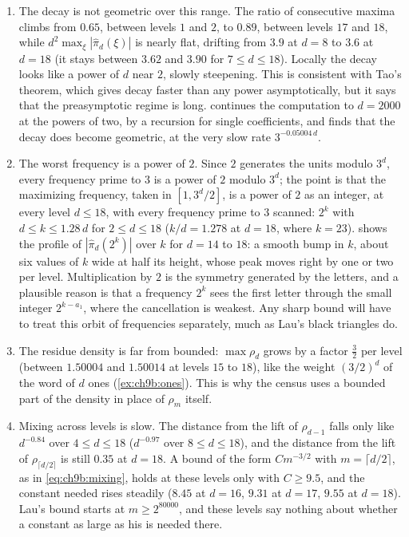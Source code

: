 \begin{enumerate}
\item The decay is not geometric over this range. The ratio of consecutive maxima climbs from $0.65$, between levels $1$ and $2$, to $0.89$, between levels $17$ and $18$, while $d^2\max_\xi|\widehat\pi_d(\xi)|$ is nearly flat, drifting from $3.9$ at $d=8$ to $3.6$ at $d=18$ (it stays between $3.62$ and $3.90$ for $7\le d\le18$). Locally the decay looks like a power of $d$ near $2$, slowly steepening. This is consistent with Tao's theorem, which gives decay faster than any power asymptotically, but it says that the preasymptotic regime is long.  continues the computation to $d=2000$ at the powers of two, by a recursion for single coefficients, and finds that the decay does become geometric, at the very slow rate $3^{-0.05004\,d}$.
\item The worst frequency is a power of $2$. Since $2$ generates the units modulo $3^d$, every frequency prime to $3$ is a power of $2$ modulo $3^d$; the point is that the maximizing frequency, taken in $[1,3^d/2]$, is a power of $2$ as an integer, at every level $d\le18$, with every frequency prime to $3$ scanned: $2^k$ with $d\le k\le1.28\,d$ for $2\le d\le18$ ($k/d=1.278$ at $d=18$, where $k=23$).  shows the profile of $|\widehat\pi_d(2^k)|$ over $k$ for $d=14$ to $18$: a smooth bump in $k$, about six values of $k$ wide at half its height, whose peak moves right by one or two per level. Multiplication by $2$ is the symmetry generated by the letters, and a plausible reason is that a frequency $2^k$ sees the first letter through the small integer $2^{k-a_1}$, where the cancellation is weakest. Any sharp bound will have to treat this orbit of frequencies separately, much as Lau's black triangles do.
\item The residue density is far from bounded: $\max\rho_d$ grows by a factor $\frac32$ per level (between $1.50004$ and $1.50014$ at levels $15$ to $18$), like the weight $(3/2)^d$ of the word of $d$ ones (\cref{ex:ch9b:ones}). This is why the census uses a bounded part of the density in place of $\rho_m$ itself.
\item Mixing across levels is slow. The distance from the lift of $\rho_{d-1}$ falls only like $d^{-0.84}$ over $4\le d\le18$ ($d^{-0.97}$ over $8\le d\le18$), and the distance from the lift of $\rho_{\lceil d/2\rceil}$ is still $0.35$ at $d=18$. A bound of the form $Cm^{-3/2}$ with $m=\lceil d/2\rceil$, as in \eqref{eq:ch9b:mixing}, holds at these levels only with $C\ge9.5$, and the constant needed rises steadily ($8.45$ at $d=16$, $9.31$ at $d=17$, $9.55$ at $d=18$). Lau's bound starts at $m\ge2^{80000}$, and these levels say nothing about whether a constant as large as his is needed there.
\end{enumerate}

